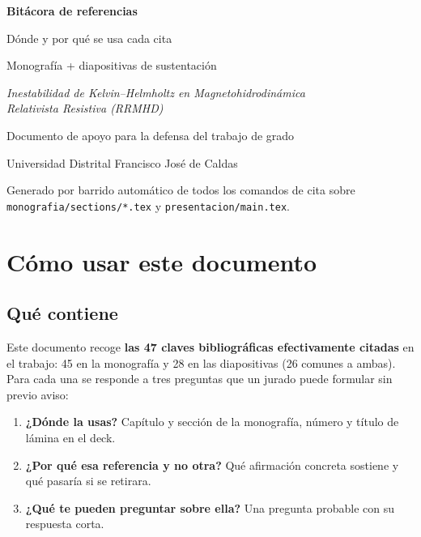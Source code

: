 \documentclass[11pt,openany]{report}
\begin{document}
\begin{titlepage}
\centering
\vspace*{3cm}
{\Huge\bfseries\color{azulud} Bitácora de referencias\par}
\vspace{0.6cm}
{\LARGE Dónde y por qué se usa cada cita\par}
\vspace{0.4cm}
{\large Monografía + diapositivas de sustentación\par}
\vspace{2.5cm}
{\large\itshape Inestabilidad de Kelvin--Helmholtz en Magnetohidrodinámica\\ Relativista Resistiva (RRMHD)\par}
\vspace{2.5cm}
{\large Documento de apoyo para la defensa del trabajo de grado\par}
\vspace{0.3cm}
{\normalsize Universidad Distrital Francisco José de Caldas\par}
\vfill
{\small Generado por barrido automático de todos los comandos de cita
sobre \texttt{monografia/sections/*.tex} y \texttt{presentacion/main.tex}.\par}
\end{titlepage}

\tableofcontents
\clearpage

\chapter{Cómo usar este documento}

\section{Qué contiene}

Este documento recoge \textbf{las 47 claves bibliográficas efectivamente
citadas} en el trabajo: 45 en la monografía y 28 en las diapositivas
(26 comunes a ambas). Para cada una se responde a tres preguntas que
un jurado puede formular sin previo aviso:

\begin{enumerate}
  \item \textbf{¿Dónde la usas?} Capítulo y sección de la monografía,
        número y título de lámina en el deck.
  \item \textbf{¿Por qué esa referencia y no otra?} Qué afirmación
        concreta sostiene y qué pasaría si se retirara.
  \item \textbf{¿Qué te pueden preguntar sobre ella?} Una pregunta
        probable con su respuesta corta.
\end{enumerate}
\end{document}
